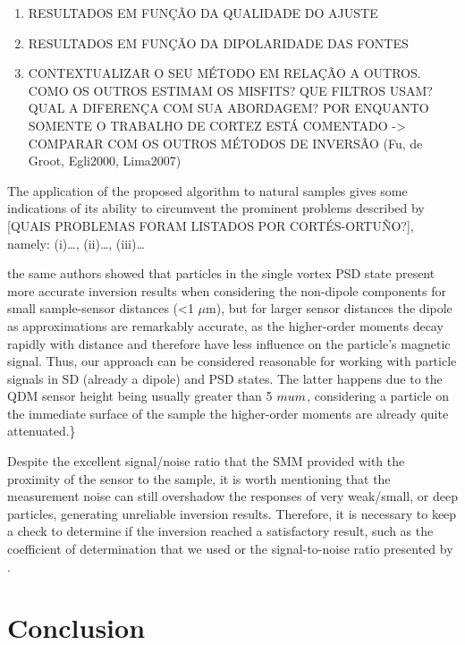 \begin{enumerate}
\item RESULTADOS EM FUNÇÃO DA QUALIDADE DO AJUSTE
\item RESULTADOS EM FUNÇÃO DA DIPOLARIDADE DAS FONTES
\item CONTEXTUALIZAR O SEU MÉTODO EM RELAÇÃO A OUTROS. COMO OS OUTROS ESTIMAM
  OS MISFITS? QUE FILTROS USAM? QUAL A DIFERENÇA COM SUA ABORDAGEM? POR
  ENQUANTO SOMENTE O TRABALHO DE CORTEZ ESTÁ COMENTADO -> COMPARAR COM
  OS OUTROS MÉTODOS DE INVERSÃO (Fu, de Groot, Egli2000, Lima2007)
\end{enumerate}

The application of the proposed algorithm to natural samples gives some
indications of its ability to circumvent the prominent problems described by
\citep{CortesOrtuno2022} [QUAIS PROBLEMAS FORAM LISTADOS POR CORTÉS-ORTUÑO?],
namely: (i)\dots, (ii)\dots, (iii)\dots

the same authors showed that particles in the single vortex PSD state present
more accurate inversion results when considering the non-dipole components for
small sample-sensor distances (\textless 1 $\mu$m), but for larger sensor
distances the dipole as approximations are remarkably accurate, as the
higher-order moments decay rapidly with distance and therefore have less
influence on the particle's magnetic signal. Thus, our approach can be
considered reasonable for working with particle signals in SD (already a
dipole) and PSD states. The latter happens due to the QDM sensor height being
usually greater than 5 $\\mu m$, considering a particle on the immediate
surface of the sample the higher-order moments are already quite attenuated.\}

Despite the excellent signal/noise ratio that the SMM provided with the
proximity of the sensor to the sample, it is worth mentioning that the
measurement noise can still overshadow the responses of very weak/small, or
deep particles, generating unreliable inversion results. Therefore, it is
necessary to keep a check to determine if the inversion reached a satisfactory
result, such as the coefficient of determination that we used or the
signal-to-noise ratio presented by \citep{CortesOrtuno2022}.


\section{Conclusion}

